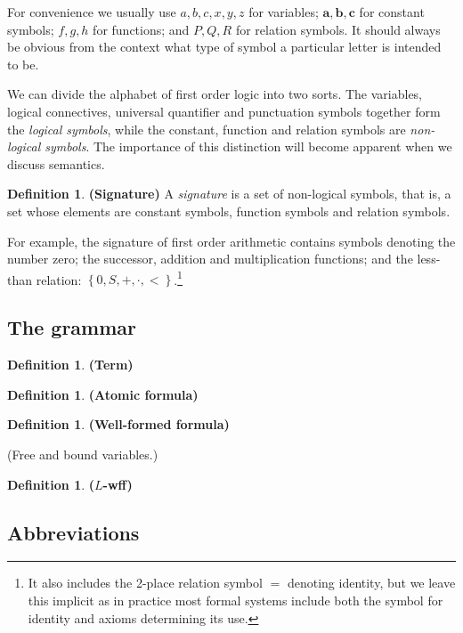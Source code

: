 \documentclass[10pt, a4paper, oneside]{article}
\theoremstyle{definition}
\newtheorem{dfn}[thm]{Definition}
\theoremstyle{remark}
\theoremstyle{plain}
\begin{document}
For convenience we usually use $a, b, c, x, y, z$ for variables; $\mathbf{a},
\mathbf{b}, \mathbf{c}$ for constant symbols; $f, g, h$ for functions; and $P,
Q, R$ for relation symbols. It should always be obvious from the context what
type of symbol a particular letter is intended to be.

We can divide the alphabet of first order logic into two sorts. The variables,
logical connectives, universal quantifier and punctuation symbols together form
the \emph{logical symbols}, while the constant, function and relation symbols
are \emph{non-logical symbols}. The importance of this distinction will become
apparent when we discuss semantics.

\begin{dfn}
    \textbf{(Signature)}
    A \emph{signature} is a set of non-logical symbols, that is, a set whose
    elements are constant symbols, function symbols and relation symbols.
\end{dfn}

For example, the signature of first order arithmetic contains symbols denoting
the number zero; the successor, addition and multiplication functions; and the
less-than relation: $\left\{ 0, S, +, \cdot, < \right\}$.\footnote{It also
includes the 2-place relation symbol $=$ denoting identity, but we leave this
implicit as in practice most formal systems include both the symbol for identity
and axioms determining its use.}

\subsection{The grammar}

\begin{dfn}
    \textbf{(Term)}
\end{dfn}

\begin{dfn}
    \textbf{(Atomic formula)}
\end{dfn}

\begin{dfn}
    \textbf{(Well-formed formula)}
\end{dfn}

(Free and bound variables.)

\begin{dfn}
    \textbf{($L$-wff)}
\end{dfn}

\subsection{Abbreviations}
\end{document}

